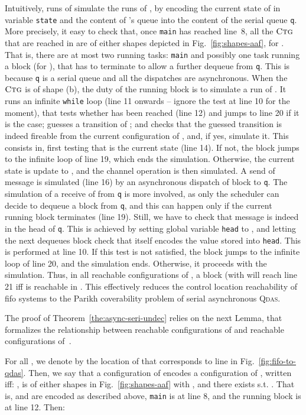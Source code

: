 \documentclass[runningheads,oribibl,]{article}
\newcommand{\qdas}{\textsc{Qdas}\xspace}
\newcommand{\fifo}{fifo\xspace}
\newcommand{\ctg}{\ensuremath{\textsc{Ctg}}\xspace}
\begin{document}
Intuitively, runs of  simulate the runs of , by encoding the
current state of  in variable \texttt{state} and the content of
's queue into the content of the serial queue \texttt{q}. More
precisely, it easy to check that, once \texttt{main} has reached
line~8, all the \ctg that are reached in  are of either shapes
depicted in Fig.~\ref{fig:shapes-aaf}, for . That is, there are at most two running
tasks: \texttt{main} and possibly one task running a  block (for
), that has to terminate to allow a further
dequeue from \texttt{q}. This is because \texttt{q} is a serial queue
and all the dispatches are asynchronous. When the \ctg is of shape
\textsf{(b)}, the duty of the running  block is to simulate a run
of . It runs an infinite \texttt{while} loop (line 11 onwards --
ignore the test at line 10 for the moment), that  tests whether
 has been reached (line 12) and jumps to line 20 if it is the case;
 guesses a transition  of ; and  checks that
the guessed transition is indeed fireable from the current
configuration of , and, if yes, simulate it. This consists in,
first testing that  is the current state (line 14). If not, the
block jumps to the infinite loop of line 19, which ends the
simulation. Otherwise, the current state is update to , and the
channel operation is then simulated. A send of message  is
simulated (line 16) by an asynchronous dispatch of block  to
\texttt{q}. The simulation of a receive of  from \texttt{q} is more
involved, as only the scheduler can decide to dequeue a block from
\texttt{q}, and this can happen only if the current running block
terminates (line 19). Still, we have to check that message  is
indeed in the head of \texttt{q}. This is achieved by setting global
variable \texttt{head} to , and letting the next dequeues block
check that itself encodes the value stored into \texttt{head}. This is
performed at line 10. If this test is not satisfied, the block jumps
to the infinite loop of line 20, and the simulation ends. Otherwise,
it proceeds with the simulation. Thus, in all reachable configurations
of , a block  (with  will reach line 21
iff  is reachable in . This effectively reduces the control
location reachability of \fifo systems to the Parikh coverability
problem of serial asynchronous \qdas.


The proof of Theorem~\ref{the:async-seri-undec} relies on the
next Lemma, that formalizes the relationship between reachable
configurations of  and reachable configurations of~.

For all , we denote by  the
location of  that corresponds to line  in
Fig.~\ref{fig:fifo-to-qdas}. Then, we say that a configuration
 of  encodes a configuration  of ,
written  iff: 
,   is of either shapes in
Fig.~\ref{fig:shapes-aaf} with , 
 and  there exists  s.t. . That is,  and
 are encoded as described above, \texttt{main} is at line 8, and
the running  block is at line 12. Then:
\end{document}
